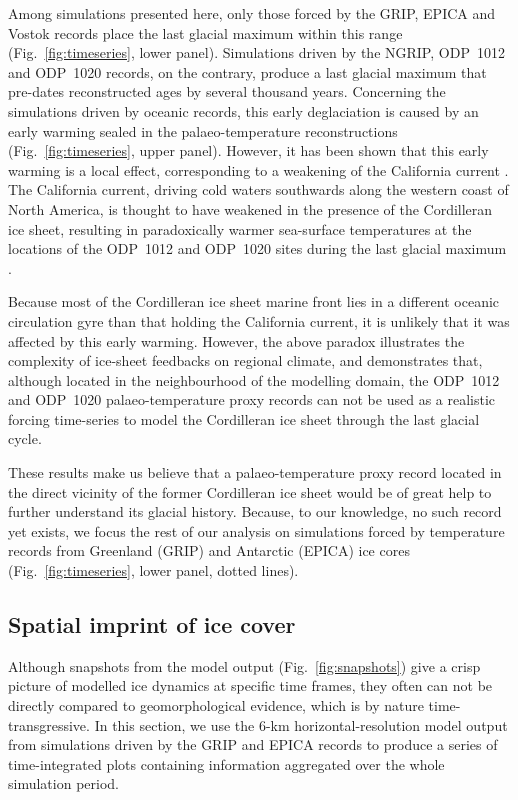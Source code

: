 \documentclass[tc, manuscript]{copernicus}
\begin{document}
Among simulations presented here, only those forced by the GRIP, EPICA and
Vostok records place the last glacial maximum within this range
(Fig.~\ref{fig:timeseries}, lower panel). Simulations driven by the NGRIP,
ODP~1012 and ODP~1020 records, on the contrary, produce a last glacial maximum
that pre-dates reconstructed ages by several thousand years. Concerning the
simulations driven by oceanic records, this early deglaciation is caused by an
early warming sealed in the palaeo-temperature reconstructions
(Fig.~\ref{fig:timeseries}, upper panel). However, it has been shown that this
early warming is a local effect, corresponding to a weakening of the California
current \citep[Fig.~3]{Herbert.etal.2001}. The California current, driving cold
waters southwards
along the western coast of North America, is thought to have weakened in the
presence of the Cordilleran ice sheet, resulting in paradoxically warmer
sea-surface temperatures at the locations of the ODP~1012 and ODP~1020 sites
during the last glacial maximum \citep{Herbert.etal.2001}.

Because most of the Cordilleran ice sheet marine front lies in a different
oceanic circulation gyre than that holding the California current, it is
unlikely that it was affected by this early warming. However, the above paradox
illustrates the complexity of ice-sheet feedbacks on regional climate, and
demonstrates that, although located in the neighbourhood of the modelling
domain, the ODP~1012 and ODP~1020 palaeo-temperature proxy records can not be
used as a realistic forcing time-series to model the Cordilleran ice sheet
through the last glacial cycle.

These results make us believe that a palaeo-temperature proxy record located
in the direct vicinity of the former Cordilleran ice sheet would be of great
help to further understand its glacial history. Because, to our knowledge, no
such record yet exists, we focus the rest of our analysis on simulations forced
by temperature records from Greenland (GRIP) and Antarctic (EPICA) ice cores
(Fig.~\ref{fig:timeseries}, lower panel, dotted lines).


\subsection{Spatial imprint of ice cover}

Although snapshots from the model output (Fig.~\ref{fig:snapshots}) give a
crisp picture of modelled ice dynamics at specific time frames, they often
can not be directly compared to geomorphological evidence, which is by nature
time-transgressive. In this section, we use the 6-km horizontal-resolution
model output from simulations driven by the GRIP and EPICA records to produce
a series of time-integrated plots containing information aggregated over the
whole simulation period.
\end{document}

